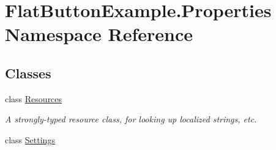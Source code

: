 \hypertarget{namespace_flat_button_example_1_1_properties}{}\section{Flat\+Button\+Example.\+Properties Namespace Reference}
\label{namespace_flat_button_example_1_1_properties}
\subsection*{Classes}
\begin{DoxyCompactItemize}
\item 
class \mbox{\hyperlink{class_flat_button_example_1_1_properties_1_1_resources}{Resources}}
\begin{DoxyCompactList}\small\item\em A strongly-\/typed resource class, for looking up localized strings, etc. \end{DoxyCompactList}\item 
class \mbox{\hyperlink{class_flat_button_example_1_1_properties_1_1_settings}{Settings}}
\end{DoxyCompactItemize}

